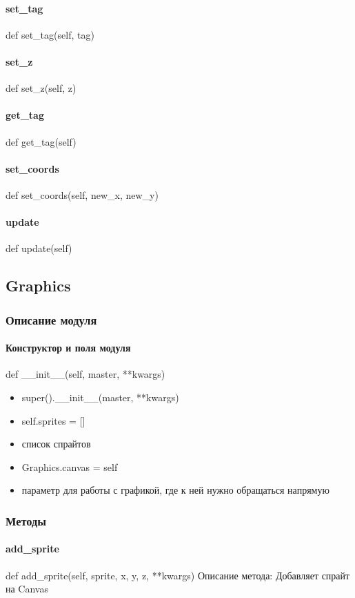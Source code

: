 \paragraph{set\_tag}
def set\_tag(self, tag)
\paragraph{set\_z}
def set\_z(self, z)
\paragraph{get\_tag}
def get\_tag(self)
\paragraph{set\_coords}
def set\_coords(self, new\_x, new\_y)
\paragraph{update}
def update(self)
\subsection{Graphics}
\subsubsection{Описание модуля}
\paragraph{Конструктор и поля модуля}
def \_\_init\_\_(self, master, **kwargs)
\begin{itemize}
	\item super().\_\_init\_\_(master, **kwargs)
	\item self.sprites = [] 
	\item список спрайтов
	\item Graphics.canvas = self
	\item параметр для работы с графикой, где к ней нужно обращаться напрямую
\end{itemize}
\subsubsection{Методы}
\paragraph{add\_sprite}
def add\_sprite(self, sprite, x, y, z, **kwargs)
Описание метода: Добавляет спрайт на Canvas
